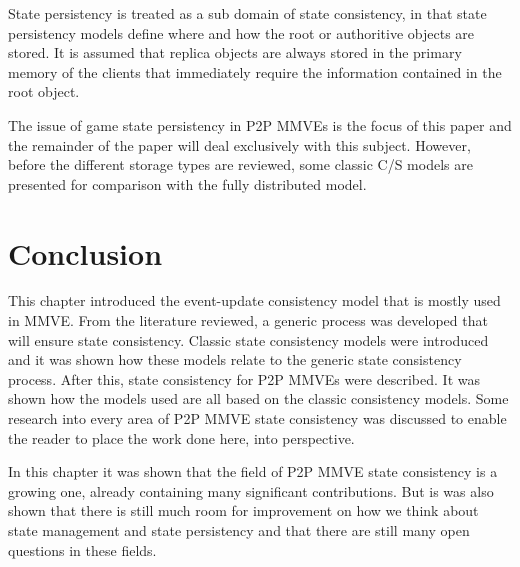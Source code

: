 State persistency is treated as a sub domain of state consistency, in that state persistency models define where and how the root or authoritive
objects are stored. It is assumed that replica objects are always stored in the primary memory of the clients that immediately require the
information contained in the root object.

The issue of game state persistency in P2P MMVEs is the focus of this paper and the remainder of the paper will deal exclusively with this subject.
However, before the different storage types are reviewed, some classic C/S models are presented for comparison with the fully distributed model.

\section{Conclusion}

This chapter introduced the event-update consistency model that is mostly used in MMVE. From the literature reviewed, a generic process was developed that will ensure state consistency. Classic state consistency models were introduced and it was shown how these models relate to the generic state consistency process. After this, state consistency for P2P MMVEs were described. It was shown how the models used are all based on the classic consistency models. Some research into every area of P2P MMVE state consistency was discussed to enable the reader to place the work done here, into perspective.

In this chapter it was shown that the field of P2P MMVE state consistency is a growing one, already containing many significant contributions. But is was also shown that there is still much room for improvement on how we think about state management and state persistency and that there are still many open questions in these fields.
